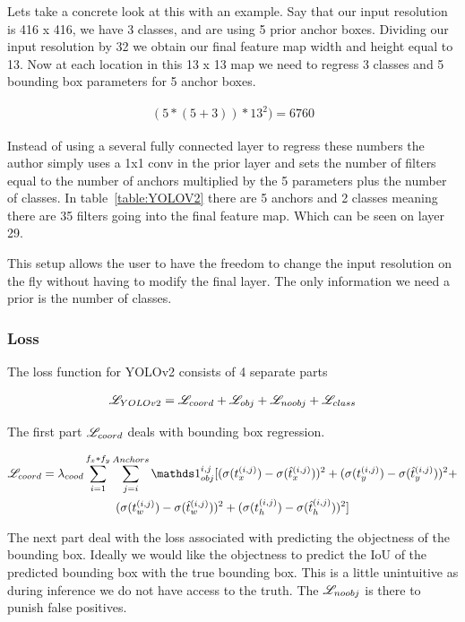 Lets take a concrete look at this with an example. Say that our input resolution is 416 x 416, we have 3 classes, and are using 5 prior anchor boxes. Dividing our input resolution by 32 we obtain our final feature map width and height equal to 13. Now at each location in this 13 x 13 map we need to regress 3 classes and 5 bounding box parameters for 5 anchor boxes.

\begin{align}
    (5 * (5 + 3)) * 13^2) = 6760
\end{align}

Instead of using a several fully connected layer to regress these numbers the author simply uses a 1x1 conv in the prior layer and sets the number of filters equal to the number of anchors multiplied by the 5 parameters plus the number of classes. In table~\ref{table:YOLOV2} there are 5 anchors and 2 classes meaning there are 35 filters going into the final feature map. Which can be seen on layer 29.

This setup allows the user to have the freedom to change the input resolution on the fly without having to modify the final layer. The only information we need a prior is the number of classes.

\subsubsection{Loss}

The loss function for YOLOv2 consists of 4 separate parts

\begin{align}
    \mathscr{L}_{YOLOv2} = \mathscr{L}_{coord} + \mathscr{L}_{obj} + \mathscr{L}_{noobj} + \mathscr{L}_{class} \\
\end{align}

The first part $\mathscr{L}_{coord}$ deals with bounding box regression.

\begin{multline}
    \Loss_{coord} = \lambda_{cood} \sum_{i=1}^{f_x*f_y} \sum_{j=i}^{Anchors}
    \indicator_{obj}^{i,j} [
        (\sigma(t_x^{(i,j)}) - \sigma(\hat{t}_x^{(i,j)}))^2 +
        (\sigma(t_y^{(i,j)}) - \sigma(\hat{t}_y^{(i,j)}))^2 + \\
        (\sigma(t_w^{(i,j)}) - \sigma(\hat{t}_w^{(i,j)}))^2 +
        (\sigma(t_h^{(i,j)}) - \sigma(\hat{t}_h^{(i,j)}))^2] \\
\end{multline}

The next part deal with the loss associated with predicting the objectness of the bounding box. Ideally we would like the objectness to predict the IoU of the predicted bounding box with the true bounding box. This is a little unintuitive as during inference we do not have access to the truth. The $\mathscr{L}_{noobj}$ is there to punish false positives.

